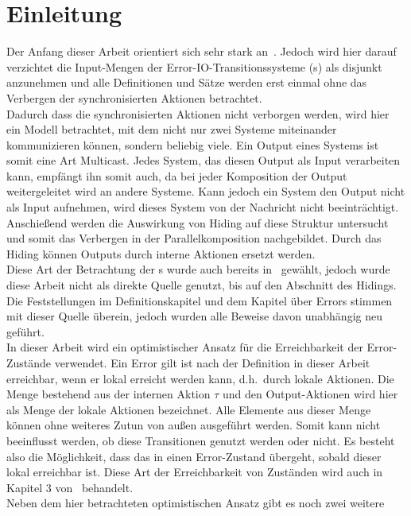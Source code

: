 \chapter{Einleitung}

Der Anfang dieser Arbeit orientiert sich sehr stark an~\cite{Vogler2014EIO}.
Jedoch wird hier darauf verzichtet die Input-Mengen der
Error-IO-Transitionssysteme (\EIO{}s) als disjunkt anzunehmen und alle
Definitionen und Sätze werden erst einmal ohne das Verbergen der
synchronisierten Aktionen betrachtet.\\
Dadurch dass die synchronisierten Aktionen nicht verborgen werden, wird hier
ein Modell betrachtet, mit dem nicht nur zwei Systeme miteinander kommunizieren können,
sondern beliebig viele. Ein Output eines Systems ist somit eine Art Multicast.
Jedes System, das diesen Output als Input verarbeiten kann, empfängt ihn somit auch,
da bei jeder Komposition der Output weitergeleitet wird an andere Systeme.
Kann jedoch ein System den Output nicht als Input aufnehmen, wird dieses System von
der Nachricht nicht beeinträchtigt.\\
Anschießend werden die Auswirkung von Hiding auf diese Struktur
untersucht und somit das Verbergen in der Parallelkomposition nachgebildet.
Durch das Hiding können Outputs durch interne Aktionen ersetzt werden.\\
Diese Art der Betrachtung der
\EIO{}s wurde auch bereits in~\cite{Schlosser2012BA} gewählt, jedoch wurde
diese Arbeit nicht als direkte Quelle genutzt, bis auf den Abschnitt des
Hidings. Die Feststellungen im Definitionskapitel und dem Kapitel über
Errors stimmen mit dieser Quelle überein, jedoch wurden alle Beweise davon unabhängig neu
geführt.\\
In dieser Arbeit wird ein optimistischer Ansatz für die Erreichbarkeit
der Error-Zustände verwendet. Ein Error gilt ist nach der Definition in dieser
Arbeit erreichbar, wenn er lokal erreicht
werden kann, d.h.\ durch lokale Aktionen. Die Menge bestehend aus der internen
Aktion $\tau$ und den Output-Aktionen wird hier als Menge der lokale Aktionen
bezeichnet.
Alle Elemente aus dieser Menge können ohne weiteres Zutun von außen ausgeführt
werden. Somit kann nicht beeinflusst werden, ob diese Transitionen genutzt
werden oder nicht. Es besteht also die Möglichkeit, dass das \EIO{} in einen
Error-Zustand übergeht, sobald dieser lokal erreichbar ist. Diese Art der
Erreichbarkeit von Zuständen wird auch in Kapitel 3 von~\cite{Vogler2014EIO}
behandelt.\\
Neben dem hier betrachteten optimistischen Ansatz gibt es noch zwei weitere

